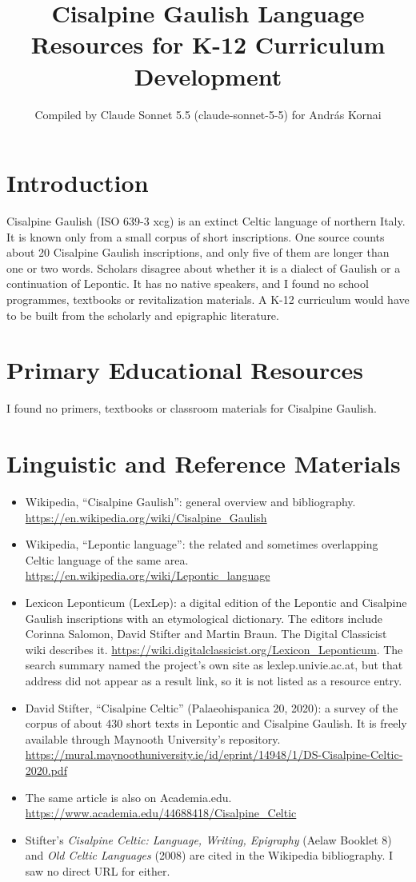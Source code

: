 \documentclass[12pt]{article}
\title{Cisalpine Gaulish Language Resources for K-12 Curriculum Development}
\author{Compiled by Claude Sonnet 5.5 (claude-sonnet-5-5) for Andr\'as Kornai}
\date{}
\begin{document}
\maketitle

\section{Introduction}
Cisalpine Gaulish (ISO 639-3 xcg) is an extinct Celtic language of northern Italy. It is known only from a small corpus of short inscriptions. One source counts about 20 Cisalpine Gaulish inscriptions, and only five of them are longer than one or two words. Scholars disagree about whether it is a dialect of Gaulish or a continuation of Lepontic. It has no native speakers, and I found no school programmes, textbooks or revitalization materials. A K-12 curriculum would have to be built from the scholarly and epigraphic literature.

\section{Primary Educational Resources}
I found no primers, textbooks or classroom materials for Cisalpine Gaulish.

\section{Linguistic and Reference Materials}
\begin{itemize}
\item Wikipedia, ``Cisalpine Gaulish'': general overview and bibliography. \url{https://en.wikipedia.org/wiki/Cisalpine_Gaulish}
\item Wikipedia, ``Lepontic language'': the related and sometimes overlapping Celtic language of the same area. \url{https://en.wikipedia.org/wiki/Lepontic_language}
\item Lexicon Leponticum (LexLep): a digital edition of the Lepontic and Cisalpine Gaulish inscriptions with an etymological dictionary. The editors include Corinna Salomon, David Stifter and Martin Braun. The Digital Classicist wiki describes it. \url{https://wiki.digitalclassicist.org/Lexicon_Leponticum}. The search summary named the project's own site as lexlep.univie.ac.at, but that address did not appear as a result link, so it is not listed as a resource entry.
\item David Stifter, ``Cisalpine Celtic'' (Palaeohispanica 20, 2020): a survey of the corpus of about 430 short texts in Lepontic and Cisalpine Gaulish. It is freely available through Maynooth University's repository. \url{https://mural.maynoothuniversity.ie/id/eprint/14948/1/DS-Cisalpine-Celtic-2020.pdf}
\item The same article is also on Academia.edu. \url{https://www.academia.edu/44688418/Cisalpine_Celtic}
\item Stifter's \emph{Cisalpine Celtic: Language, Writing, Epigraphy} (Aelaw Booklet 8) and \emph{Old Celtic Languages} (2008) are cited in the Wikipedia bibliography. I saw no direct URL for either.
\end{itemize}
\end{document}
